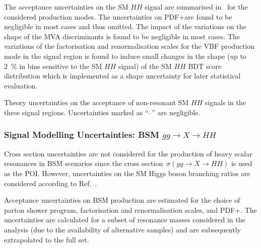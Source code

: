 The acceptance uncertainties on the SM $HH$ signal are summarised
in~ for the considered production
modes. The uncertainties on PDF+\alphas are found to be negligible in
most cases and thus omitted. The impact of the variations on the shape
of the MVA discriminants is found to be negligible in most cases. The
variations of the factorisation and renormalisation scales for the VBF
production mode in the \hadhad signal region is found to induce small
changes in the shape (up to \SI{2}{\percent} in bins sensitive to the
SM $HH$ signal) of the SM $HH$ BDT score distribution which is
implemented as a shape uncertainty for later statistical evaluation.

\begin{table}[htbp]
  \centering


  \caption{Theory uncertainties on the acceptance of non-resonant SM
    $HH$ signals in the three signal regions. Uncertainties marked as
    ``--'' are negligible.}%
  \label{tab:theory_uncertainty_signal}

  
\end{table}


\subsubsection{Signal Modelling Uncertainties: BSM $gg \to X \to HH$}

Cross section uncertainties are not considered for the production of
heavy scalar resonances in BSM scenarios since the cross
section~$\sigma(gg \to X \to HH)$ is used as the POI. However,
uncertainties on the SM Higgs boson branching ratios are considered
according to Ref.~\cite{deFlorian:2016spz}.

Acceptance uncertainties on BSM \HH production are estimated for the
choice of parton shower program, factorisation and renormalisation
scales, and PDF+\alphas. The uncertainties are calculated for a subset
of resonance masses considered in the analysis (due to the
availability of alternative samples) and are subsequently extrapolated
to the full set.

